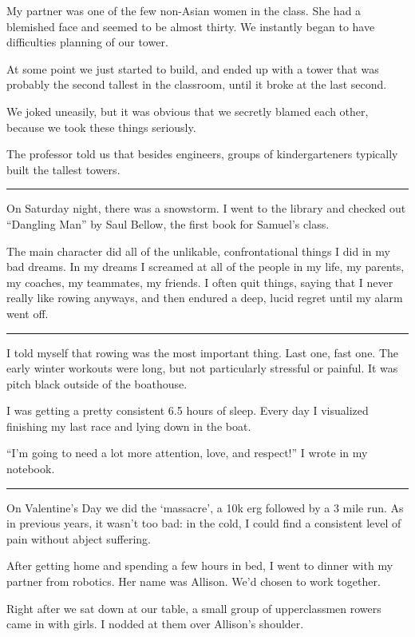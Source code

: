 My partner was one of the few non-Asian women in the class.  She had a blemished
face and seemed to be almost thirty.  We instantly began to have difficulties
planning of our tower.  

At some point we just started to build, and ended up with a tower that was
probably the second tallest in the classroom, until it broke at the last second.

We joked uneasily, but it was obvious that we secretly blamed each other,
because we took these things seriously.

The professor told us that besides engineers, groups of kindergarteners
typically built the tallest towers.

\plainfancybreak{12pt}{2}{}

On Saturday night, there was a snowstorm.  I went to the library and checked out
``Dangling Man'' by Saul Bellow, the first book for Samuel's class.

The main character did all of the unlikable, confrontational things I did in my
bad dreams.   In my dreams I screamed at all of the people in my life, my
parents, my coaches, my teammates, my friends.  I often quit things, saying that
I never really like rowing anyways, and then endured a deep, lucid regret until
my alarm went off.

\plainfancybreak{12pt}{2}{}

I told myself that rowing was the most important thing.  Last one, fast one.
The early winter workouts were long, but not particularly stressful or painful.
It was pitch black outside of the boathouse.

I was getting a pretty consistent 6.5 hours of sleep.  Every day I visualized
finishing my last race and lying down in the boat.  

``I'm going to need a lot more attention, love, and respect!'' I wrote in my
notebook. 


\plainfancybreak{12pt}{2}{}

On Valentine's Day we did the `massacre', a 10k erg followed by a 3 mile run.
As in previous years, it wasn't too bad: in the cold, I could find a consistent
level of pain without abject suffering.

After getting home and spending a few hours in bed, I went to dinner with my
partner from robotics.  Her name was Allison.  We'd chosen to work together.  

Right after we sat down at our table, a small group of upperclassmen
rowers came in with girls.  I nodded at them over Allison's shoulder.  

